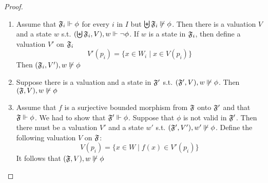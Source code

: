 \documentclass[11pt]{article}
\begin{document}
\begin{proof}
\begin{enumerate}
\item Assume that \(\mathfrak{F}_i\Vdash\phi\) for every \(i\) in \(I\) but
\(\biguplus\mathfrak{F}_i\not\Vdash\phi\). Then there is a valuation \(V\) and a
state \(w\) s.t. \((\biguplus\mathfrak{F}_i,V),w\Vdash\neg\phi\). If \(w\) is a
state in \(\mathfrak{F}_i\), then define a valuation \(V'\) on \(\mathfrak{F}_i\)
\begin{equation*}
V'(p_i)=\{x\in W_i\mid x\in V(p_i)\}
\end{equation*}
Then \((\mathfrak{F}_i,V'),w\not\Vdash\phi\)
\item Suppose there is a valuation and a state in \(\mathfrak{F}'\) s.t.
\((\mathfrak{F}',V),w\not\Vdash\phi\). Then \((\mathfrak{F},V),w\not\Vdash\phi\)
\item Assume that \(f\) is a surjective bounded morphism from \(\mathfrak{F}\) onto
\(\mathfrak{F}'\) and that \(\mathfrak{F}\Vdash\phi\). We had to show that
\(\mathfrak{F}'\Vdash\phi\). Suppose that \(\phi\) is not valid in \(\mathfrak{F}'\). Then there
must be a valuation \(V'\) and a state \(w'\) s.t.
\((\mathfrak{F}',V'),w'\not\Vdash\phi\). Define the following valuation \(V\) on
\(\mathfrak{F}\):
\begin{equation*}
V(p_i)=\{x\in W\mid f(x)\in V'(p_i)\}
\end{equation*}
It follows that \((\mathfrak{F},V),w\not\Vdash\phi\)
\end{enumerate}
\end{proof}
\end{document}
